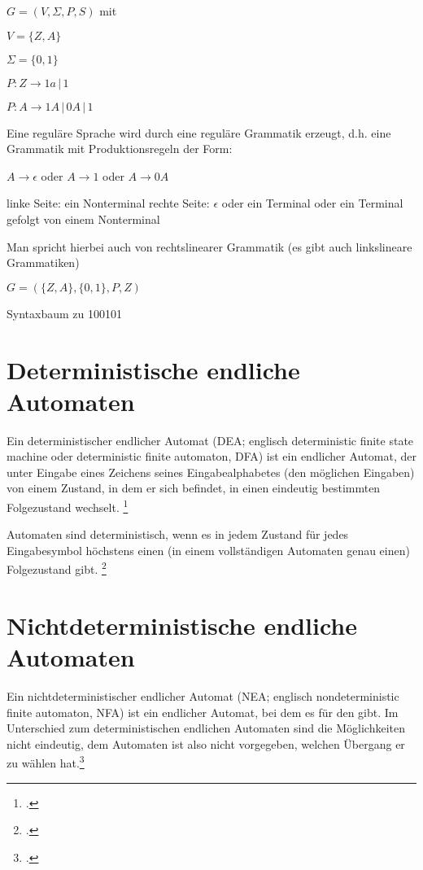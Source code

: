 \documentclass{lehramt-informatik-haupt}
\begin{document}
$G = (V, \Sigma, P, S)$ mit

$V = \{Z, A\}$

$\Sigma = \{0, 1\}$

$P: Z \rightarrow 1a \,|\, 1$

$P: A \rightarrow 1A \,|\, 0A \,|\, 1$

Eine reguläre Sprache wird durch eine reguläre
Grammatik erzeugt, d.h. eine Grammatik mit
Produktionsregeln der Form:

$A \rightarrow \epsilon$ oder $A \rightarrow 1$ oder $A \rightarrow 0A$

linke Seite: ein Nonterminal rechte Seite: $\epsilon$ oder ein Terminal
oder ein Terminal gefolgt von einem Nonterminal

Man spricht hierbei auch von rechtslinearer Grammatik (es gibt auch
linkslineare Grammatiken)

$G = (\{Z, A\}, \{0, 1\}, P, Z)$

Syntaxbaum zu 100101
\begin{center}
\end{center}

\section{Deterministische endliche Automaten}

Ein deterministischer endlicher Automat (DEA; englisch deterministic
finite state machine oder deterministic finite automaton, DFA) ist ein
endlicher Automat, der unter Eingabe eines Zeichens seines
Eingabealphabetes (den möglichen Eingaben) von einem Zustand, in dem er
sich befindet, in einen eindeutig bestimmten Folgezustand wechselt.
\footcite{wiki:dea}

Automaten sind deterministisch, wenn es in jedem Zustand für jedes
Eingabesymbol höchstens einen (in einem vollständigen Automaten genau
einen) Folgezustand gibt.
\footcite[Seite 28]{vossen}

\section{Nichtdeterministische endliche Automaten}

Ein nichtdeterministischer endlicher Automat (NEA; englisch
nondeterministic finite automaton, NFA) ist ein endlicher Automat, bei
dem es für den  gibt. Im Unterschied zum deterministischen endlichen
Automaten sind die Möglichkeiten nicht eindeutig, dem Automaten ist also
nicht vorgegeben, welchen Übergang er zu wählen hat.\footcite{wiki:nea}
\end{document}

